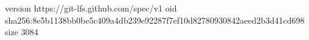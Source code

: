 version https://git-lfs.github.com/spec/v1
oid sha256:8e5b1138bb0be5c409a4db239e92287f7ef10d82780930842aeed2b3d41cd698
size 3084
